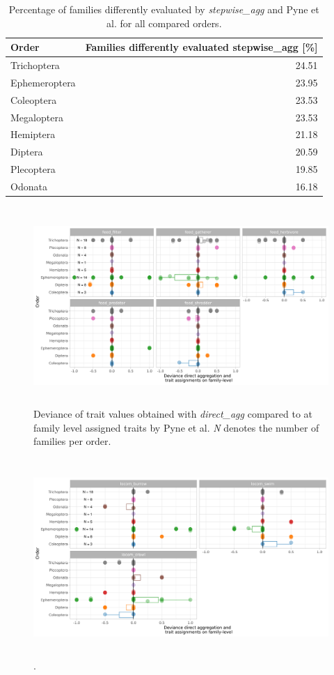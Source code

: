 \documentclass{article}
\begin{document}
\begin{table}[H]  
  \centering
  \caption{Percentage of families differently evaluated
  by \textit{stepwise\_agg} and Pyne et al. for all compared orders.} 
  \label{tab:SI_perc_stepwise_agg_expert_family_NOA}
  \begin{tabular}{lr}
  \hline
  Order & Families differently evaluated stepwise\_agg [\%] \\ 
  \hline
  Trichoptera & 24.51 \\ 
    Ephemeroptera & 23.95 \\ 
    Coleoptera & 23.53 \\ 
    Megaloptera & 23.53 \\ 
    Hemiptera & 21.18 \\ 
    Diptera & 20.59 \\ 
    Plecoptera & 19.85 \\ 
    Odonata & 16.18 \\ 
  \hline
  \end{tabular}
  \end{table}

\begin{figure}[H]
  \centering
  \caption{Deviance of trait values obtained with \textit{direct\_agg} compared to at family level assigned traits by Pyne et al. \newline
  \textit{N} denotes the number of families per order.}
  \label{fig:trait_dev_dir_agg_feeding}
  \includegraphics[width=14cm, height=7.5cm]{trait_deviations_dir_famlvl_feed.png}
\end{figure}

\begin{figure}[H]
  \centering
  \caption{.}
  \label{fig:trait_dev_dir_agg_locom}
  \includegraphics[width=14cm, height=7.5cm]{trait_deviations_dir_famlvl_locom.png}
\end{figure}
\end{document}
